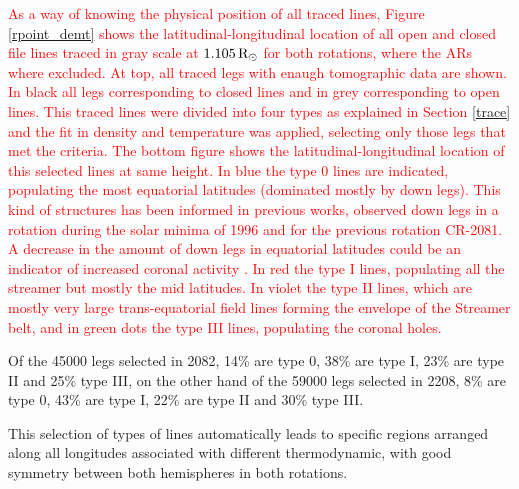 \documentclass[namedreferences]{solarphysics}
\newcommand{\mrsun}{{\rm R_\odot}}
\def\diego#1{\textcolor{red}{#1}}
\begin{document}
\begin{article}
\diego{
As a way of knowing the physical position of all traced lines, Figure \ref{rpoint_demt} shows the latitudinal-longitudinal location of all open and closed file lines traced in gray scale at $1.105\,\mrsun$ for both rotations, where the ARs where excluded. At top, all traced legs with enaugh tomographic data are shown. In black all legs corresponding to closed lines and in grey corresponding to open lines. This traced lines were divided into four types as explained in Section \ref{trace} and the fit in density and temperature was applied, selecting only those legs that met the criteria. The bottom figure shows the latitudinal-longitudinal location of this selected lines at same height. In blue the type 0 lines are indicated, populating the most equatorial latitudes (dominated mostly by down legs). This kind of structures has been informed in previous works, \citet{lloveras_2017} observed down legs in a rotation during the solar minima of 1996 and for the previous rotation CR-2081. A decrease in the amount of down legs in equatorial latitudes could be an indicator of increased coronal activity \citet{nuevo_2013}. In red the type I lines, populating all the streamer but mostly the mid latitudes. In violet the type II lines, which are mostly very large trans-equatorial field lines forming the envelope of the Streamer belt, and in green dots the type III lines, populating the coronal holes.
}

Of the 45000 legs selected in 2082, 14\% are type 0, 38\% are type I, 23\% are type II and 25\% type III, on the other hand of the 59000 legs selected in 2208, 8\% are type 0, 43\% are type I, 22\% are type II and 30\% type III.

This selection of types of lines automatically leads to specific regions arranged along all longitudes associated with different thermodynamic, with good symmetry between both hemispheres in both rotations.%



\end{article}
\end{document}
